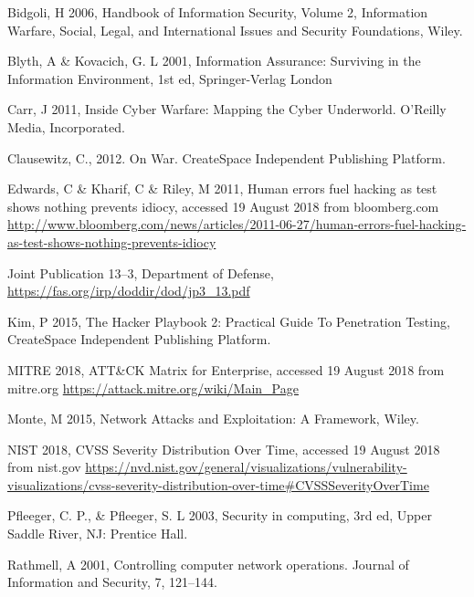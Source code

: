 \documentclass[11pt]{report}
\begin{document}
\begin{thebibliography}{9}

	Bidgoli, H 2006, Handbook of Information Security, Volume 2, Information Warfare, Social, Legal, and International Issues and Security Foundations, Wiley.

	Blyth, A \& Kovacich, G. L 2001, Information Assurance: Surviving in the Information Environment, 1st ed, Springer-Verlag London

	Carr, J 2011, Inside Cyber Warfare: Mapping the Cyber Underworld. O'Reilly Media, Incorporated.

	Clausewitz, C., 2012. On War. CreateSpace Independent Publishing Platform.

	Edwards, C \& Kharif, C \& Riley, M 2011, Human errors fuel hacking as test shows nothing prevents idiocy, accessed 19 August 2018 from bloomberg.com \url{http://www.bloomberg.com/news/articles/2011-06-27/human-errors-fuel-hacking-as-test-shows-nothing-prevents-idiocy}

	Joint Publication 13--3, Department of Defense, \url{https://fas.org/irp/doddir/dod/jp3_13.pdf}

	Kim, P 2015, The Hacker Playbook 2: Practical Guide To Penetration Testing, CreateSpace Independent Publishing Platform.

	MITRE 2018, ATT\&CK Matrix for Enterprise, accessed 19 August 2018 from mitre.org \url{https://attack.mitre.org/wiki/Main_Page}

	Monte, M 2015, Network Attacks and Exploitation: A Framework, Wiley.

	NIST 2018, CVSS Severity Distribution Over Time, accessed 19 August 2018 from nist.gov \url{https://nvd.nist.gov/general/visualizations/vulnerability-visualizations/cvss-severity-distribution-over-time#CVSSSeverityOverTime}

	Pfleeger, C. P., \& Pfleeger, S. L 2003, Security in computing, 3rd ed, Upper Saddle River, NJ: Prentice Hall.

	Rathmell, A 2001, Controlling computer network operations. Journal of Information and Security, 7, 121–144.
\end{thebibliography}
\end{document}
